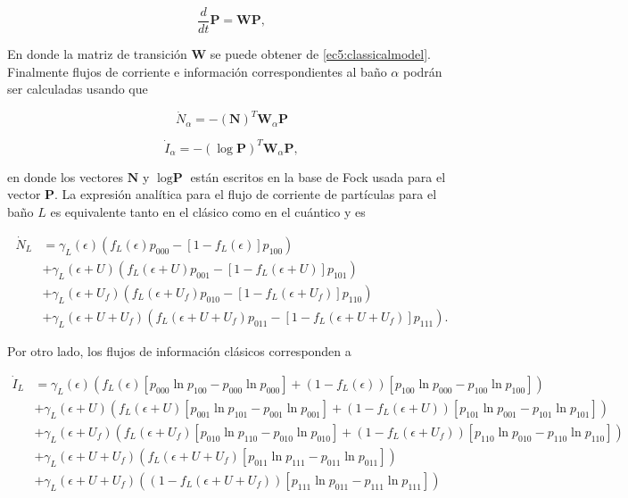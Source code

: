 \begin{equation*}
    \frac{d}{dt}\textbf{P} = \textbf{W}\textbf{P},
\end{equation*}

En donde la matriz de transición $\textbf{W}$ se puede obtener de \ref{ec5:classicalmodel}. Finalmente flujos de corriente e información correspondientes al baño $\alpha$ podrán ser calculadas usando que 

\begin{equation*}
    \dot{N}_{\alpha} = -(\textbf{N})^{T} \textbf{W}_{\alpha}\textbf{P}
\end{equation*}

\begin{equation*}
    \dot{I}_{\alpha} = -(\log \textbf{P})^{T} \textbf{W}_{\alpha}\textbf{P},
\end{equation*}


en donde los vectores $\textbf{N}$ y $\log \textbf{P}$ están escritos en la base de Fock usada para el vector $\textbf{P}$. La expresión analítica para el flujo de corriente de partículas para el baño $L$ es equivalente tanto en el clásico como en el cuántico y es 

\begin{align*}
    \dot{N}_{L} & = \gamma_{L}(\epsilon)(f_{L}(\epsilon)p_{000} - [1-f_{L}(\epsilon)]p_{100} ) \\
        & + \gamma_{L}(\epsilon + U) (f_{L}(\epsilon+U)p_{001} - [1-f_{L}(\epsilon+U)]p_{101} )  \\
        & + \gamma_{L}(\epsilon + U_{f}) (f_{L}(\epsilon+U_{f})p_{010} - [1-f_{L}(\epsilon+U_{f})]p_{110} )  \\  
        & + \gamma_{L}(\epsilon + U + U_{f}) (f_{L}(\epsilon+U + U_{f})p_{011} - [1-f_{L}(\epsilon+U+U_{f})]p_{111} ).
\end{align*}

Por otro lado, los flujos de información clásicos corresponden a 

\begin{align*}
  \dot{I}_{L}  &  =  \gamma_{L}(\epsilon)(f_{L}(\epsilon)[p_{000}\ln p_{100} - p_{000}\ln p_{000}] + (1-f_{L}(\epsilon))[p_{100}\ln p_{000} - p_{100}\ln p_{100} ] )  \\ 
      & + \gamma_{L}(\epsilon + U)(f_{L}(\epsilon + U)[p_{001}\ln p_{101} - p_{001}\ln p_{001}] + (1-f_{L}(\epsilon + U))[p_{101}\ln p_{001} -p_{101}\ln p_{101} ]   ) \\  
      & + \gamma_{L}(\epsilon + U_{f})( f_{L}(\epsilon + U_{f})[p_{010}\ln p_{110} -p_{010}\ln p_{010} ]  + (1-f_{L}(\epsilon + U_{f}))[p_{110}\ln p_{010} - p_{110}\ln p_{110} ] ) \\  
      & + \gamma_{L}(\epsilon + U + U_{f})( f_{L}(\epsilon + U + U_{f})[p_{011}\ln p_{111}- p_{011}\ln p_{011}]) \\   
      & + \gamma_{L}(\epsilon + U + U_{f})( (1-f_{L}(\epsilon+U+U_{f}) )[p_{111}\ln p_{011} - p_{111}\ln p_{111}])   
\end{align*}

